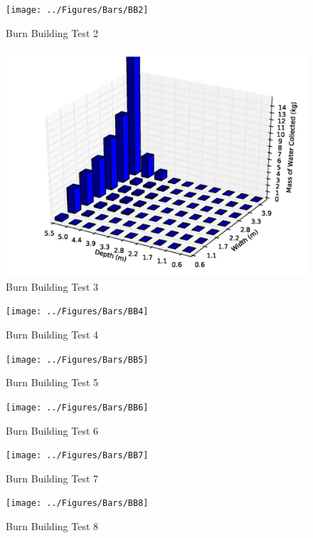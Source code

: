 \documentclass[12pt,oneside]{book}
\begin{document}
\begin{figure}[!ht]
	\texttt{[image: ../Figures/Bars/BB2]}
	\caption{Burn Building Test 2}
	\label{fig:Burn_Building_Test_2}
\end{figure}

\begin{figure}[!ht]
	\includegraphics[width=6in]{../Figures/Bars/BB3}
	\caption{Burn Building Test 3}
	\label{fig:Burn_Building_Test_3}
\end{figure}

\begin{figure}[!ht]
	\texttt{[image: ../Figures/Bars/BB4]}
	\caption{Burn Building Test 4}
	\label{fig:Burn_Building_Test_4}
\end{figure}

\clearpage

\begin{figure}[!ht]
	\texttt{[image: ../Figures/Bars/BB5]}
	\caption{Burn Building Test 5}
	\label{fig:Burn_Building_Test_5}
\end{figure}

\begin{figure}[!ht]
	\texttt{[image: ../Figures/Bars/BB6]}
	\caption{Burn Building Test 6}
	\label{fig:Burn_Building_Test_6}
\end{figure}

\begin{figure}[!ht]
	\texttt{[image: ../Figures/Bars/BB7]}
	\caption{Burn Building Test 7}
	\label{fig:Burn_Building_Test_7}
\end{figure}

\begin{figure}[!ht]
	\texttt{[image: ../Figures/Bars/BB8]}
	\caption{Burn Building Test 8}
	\label{fig:Burn_Building_Test_8}
\end{figure}
\end{document}
